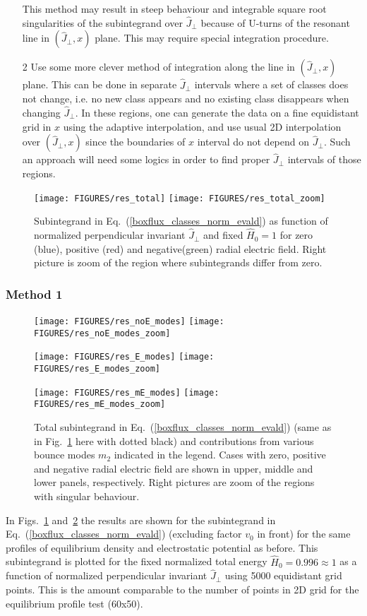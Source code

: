 \documentclass[preprint,prb,aps]{revtex4-1}
\newcommand{\eq}[1]{(\ref{#1})}
\begin{document}
\begin{itemize}
This method may result in steep behaviour and integrable square root singularities 
of the subintegrand over $\hat J_\perp$ because of U-turns of the resonant line
in $(\hat J_\perp,x)$ plane. This may require special integration procedure.
\item[2]
Use some more clever method of integration along the line in $(\hat J_\perp,x)$ plane.
This can be done in separate $\hat J_\perp$ intervals where a set of classes does not 
change, i.e. no new class appears and no existing class disappears when changing
$\hat J_\perp$. 
In these regions, one can generate the data on a fine equidistant grid 
in $x$ using the adaptive interpolation, and use usual 2D interpolation over
$(\hat J_\perp,x)$ since the boundaries of $x$ interval do not depend on 
$\hat J_\perp$. Such an approach will need some logics in order to find proper
$\hat J_\perp$ intervals of those regions.

\end{itemize}
%
\begin{figure}[ht]
\centerline{
\texttt{[image: FIGURES/res\_total]}
\texttt{[image: FIGURES/res\_total\_zoom]}
}
\caption[]{
Subintegrand in Eq.~\eq{boxflux_classes_norm_evald} as function of normalized
perpendicular invariant $\hat J_\perp$ and fixed $\hat H_0=1$ 
for zero (blue), positive (red) and 
negative(green) radial electric field. Right picture is zoom of the region where
subintegrands differ from zero.
}
\label{fig:restot}
\end{figure}

\subsubsection{Method 1}
\label{sssec:one}
%
%
\begin{figure}[ht]
\centerline{
\texttt{[image: FIGURES/res\_noE\_modes]}
\texttt{[image: FIGURES/res\_noE\_modes\_zoom]}
}
\centerline{
\texttt{[image: FIGURES/res\_E\_modes]}
\texttt{[image: FIGURES/res\_E\_modes\_zoom]}
}
\centerline{
\texttt{[image: FIGURES/res\_mE\_modes]}
\texttt{[image: FIGURES/res\_mE\_modes\_zoom]}
}
\caption[]{
Total subintegrand in Eq.~\eq{boxflux_classes_norm_evald} 
(same as in Fig.~\ref{fig:restot} here with dotted black) and contributions
from various bounce modes $m_2$ indicated in the legend.
Cases with zero, positive and negative radial electric field are shown in upper,
middle and lower panels, respectively. Right pictures are zoom of the 
regions with singular behaviour.
}
\label{fig:restot_modes}
\end{figure}
%
%
In Figs.~\ref{fig:restot} and~\ref{fig:restot_modes} the results are shown for the
subintegrand in Eq.~\eq{boxflux_classes_norm_evald} (excluding factor $v_0$ in front)
for the same profiles of equilibrium density and electrostatic potential as before.
This subintegrand is plotted for the fixed normalized total energy 
$\hat H_0 = 0.996 \approx 1$ as a function of normalized perpendicular invariant
$\hat J_\perp$ using 5000 equidistant grid points. This is the amount comparable
to the number of points in 2D grid for the equilibrium profile test (60x50).
\end{document}
